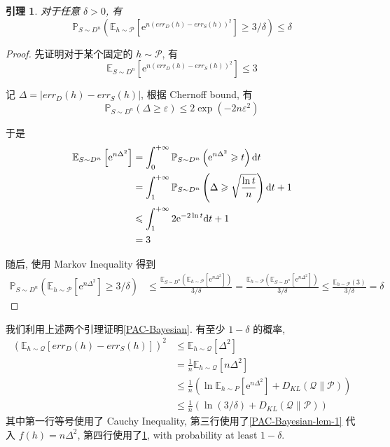 \documentclass[8pt]{article}
\theoremstyle{compact}
\newtheorem{lemma}{引理}[section]
\def\le{\leqslant}
\def\ge{\geqslant}
\def\e{\mathrm{e}}
\begin{document}
\begin{lemma}
	对于任意 $\delta > 0$, 有 $$\mathbb P_{S \sim D^n} \left(\mathbb E_{h \sim \mathcal P} [ \e^{n(err_D(h) - err_S(h))^2} ] \ge 3/\delta\right) \le \delta$$
	\label{PAC-Bayesian-lem-2}
\end{lemma}
\begin{proof}
	先证明对于某个固定的 $h \sim \mathcal P$, 有 $$\mathbb E_{S \sim D^n}[\e^{n(err_D(h) - err_S(h))^2}] \le 3$$

	记 $\Delta = |err_D(h) - err_S(h)|$, 根据 Chernoff bound, 有 $$\mathbb P_{S \sim D^n}(\Delta \ge \varepsilon) \le 2\exp(-2n\varepsilon^2)$$

	于是\begin{equation*}
		\begin{split}			
			\mathbb E_{S \sim D^n} \left[\e^{n\Delta^2}\right] &= \int_0^{+\infty}\mathbb P_{S \sim D^n}\left(\e^{n\Delta^2} \ge t\right) \text dt\\
			&= \int_1^{+\infty}\mathbb P_{S \sim D^n}\left(\Delta \ge \sqrt{\frac{\ln t}{n}}\right) \text dt + 1\\
			&\le \int_1^{+\infty}2\e^{-2\ln t}\text dt + 1\\
			&= 3
		\end{split}
	\end{equation*}

	随后, 使用 Markov Inequality 得到\begin{equation*}
		\begin{split}
			\mathbb P_{S \sim D^n} \left(\mathbb E_{h \sim \mathcal P} [ \e^{n\Delta^2} ] \ge 3/\delta\right) &\le \frac{\mathbb E_{S \sim D^n} \left(\mathbb E_{h \sim \mathcal P} [ \e^{n\Delta^2} ]\right)}{3/\delta} = \frac{ \mathbb E_{h \sim \mathcal P}\left(\mathbb E_{S \sim D^n} [ \e^{n\Delta^2} ]\right)}{3/\delta} \le \frac{ \mathbb E_{h \sim \mathcal P}\left(3\right)}{3/\delta} = \delta
		\end{split}
	\end{equation*}
\end{proof}

我们利用上述两个引理证明\cref{PAC-Bayesian}. 有至少 $1 - \delta$ 的概率, 
\begin{equation*}
	\begin{split}
		\left(\mathbb E_{h \sim \mathcal Q}[err_D(h) - err_S(h)]\right)^2
		& \le \mathbb E_{h \sim \mathcal Q}[\Delta^2]\\
		&= \frac1n \mathbb E_{h \sim \mathcal Q}[n\Delta^2]\\
		&\le \frac1n \left(\ln \mathbb E_{h \sim P}\left[\e^{n\Delta^2}\right] + D_{KL}(\mathcal Q \| \mathcal P)\right)\\
		&\le \frac1n \left(\ln(3/\delta) + D_{KL}(\mathcal Q \| \mathcal P)\right)
	\end{split}
\end{equation*}
其中第一行等号使用了 Cauchy Inequality, 第三行使用了\cref{PAC-Bayesian-lem-1} 代入 $f(h) = n\Delta^2$, 第四行使用了\cref{PAC-Bayesian-lem-2}, with probability at least $1 - \delta$.
\end{document}
